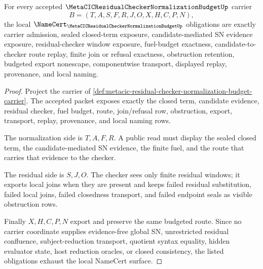 \begin{theorem}
\label{thm:metacic-residual-checker-normalization-budget-obligations}
For every accepted $\MetaCICResidualCheckerNormalizationBudgetUp$ carrier
$$
B=(T,A,S,F,R,J,O,X,H,C,P,N),
$$
the local $\NameCert_{\MetaCICResidualCheckerNormalizationBudgetUp}$ obligations are exactly carrier admission, sealed closed-term exposure, candidate-mediated SN evidence exposure, residual-checker window exposure, fuel-budget exactness, candidate-to-checker route replay, finite join or refusal exactness, obstruction retention, budgeted export nonescape, componentwise transport, displayed replay, provenance, and local naming.
\end{theorem}
\begin{proof}
Project the carrier of \autoref{def:metacic-residual-checker-normalization-budget-carrier}. The accepted packet exposes exactly the closed term, candidate evidence, residual checker, fuel budget, route, join/refusal row, obstruction, export, transport, replay, provenance, and local naming rows.

The normalization side is $T,A,F,R$. A public read must display the sealed closed term, the candidate-mediated SN evidence, the finite fuel, and the route that carries that evidence to the checker.

The residual side is $S,J,O$. The checker sees only finite residual windows; it exports local joins when they are present and keeps failed residual substitution, failed local joins, failed closedness transport, and failed endpoint seals as visible obstruction rows.

Finally $X,H,C,P,N$ export and preserve the same budgeted route. Since no carrier coordinate supplies evidence-free global SN, unrestricted residual confluence, subject-reduction transport, quotient syntax equality, hidden evaluator state, host reduction oracles, or closed consistency, the listed obligations exhaust the local NameCert surface.
\end{proof}

